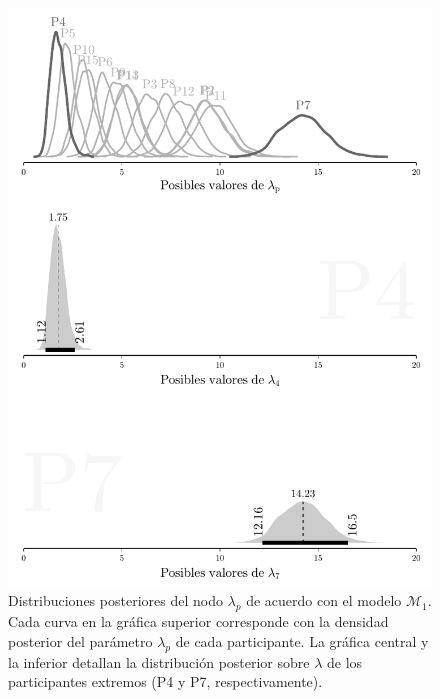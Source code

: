 \documentclass{article}
\begin{document}
\begin{figure}[H]
\centerline{\includegraphics[width=1\textwidth]{lambda_m1.pdf}}
\caption{Distribuciones posteriores del nodo $\lambda_p$ de acuerdo con el modelo $\mathcal M_1$. Cada curva en la gráfica superior corresponde con la densidad posterior del parámetro $\lambda_p$ de cada participante. La gráfica central y la inferior detallan la distribución posterior sobre $\lambda$ de los participantes extremos (P4 y P7, respectivamente). }
\label{fig:lambda_m1}
\end{figure}
\end{document}
